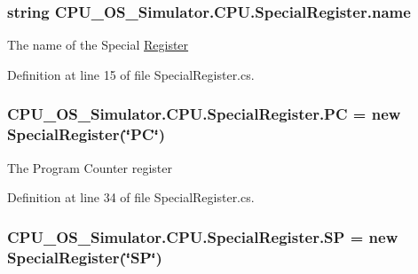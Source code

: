 \subsubsection[{name}]{\setlength{\rightskip}{0pt plus 5cm}string C\+P\+U\+\_\+\+O\+S\+\_\+\+Simulator.\+C\+P\+U.\+Special\+Register.\+name\hspace{0.3cm}{\ttfamily [private]}}\label{class_c_p_u___o_s___simulator_1_1_c_p_u_1_1_special_register_ac521aef66f5fe6a88486e70f5ade8326}


The name of the Special \hyperlink{class_c_p_u___o_s___simulator_1_1_c_p_u_1_1_register}{Register} 



Definition at line 15 of file Special\+Register.\+cs.

\hypertarget{class_c_p_u___o_s___simulator_1_1_c_p_u_1_1_special_register_afc3205003157a5f135752e6a4f8ffb8a}{}
\subsubsection[{P\+C}]{ C\+P\+U\+\_\+\+O\+S\+\_\+\+Simulator.\+C\+P\+U.\+Special\+Register.\+P\+C = new {\bf Special\+Register}(\char`\"{}P\+C\char`\"{})\hspace{0.3cm}{\ttfamily [static]}}\label{class_c_p_u___o_s___simulator_1_1_c_p_u_1_1_special_register_afc3205003157a5f135752e6a4f8ffb8a}


The Program Counter register 



Definition at line 34 of file Special\+Register.\+cs.

\hypertarget{class_c_p_u___o_s___simulator_1_1_c_p_u_1_1_special_register_ae1699c7972763e73e3f1cfe467cc82e9}{}
\subsubsection[{S\+P}]{ C\+P\+U\+\_\+\+O\+S\+\_\+\+Simulator.\+C\+P\+U.\+Special\+Register.\+S\+P = new {\bf Special\+Register}(\char`\"{}S\+P\char`\"{})\hspace{0.3cm}{\ttfamily [static]}}\label{class_c_p_u___o_s___simulator_1_1_c_p_u_1_1_special_register_ae1699c7972763e73e3f1cfe467cc82e9}


